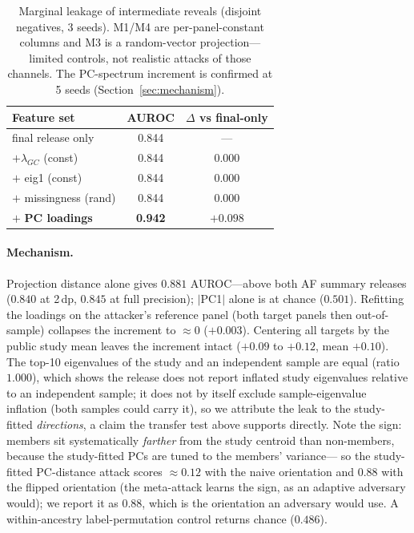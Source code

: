 \documentclass[11pt]{article}
\begin{document}
\begin{table}[t]
\centering
\caption{Marginal leakage of intermediate reveals (disjoint negatives, 3
seeds). M1/M4 are per-panel-constant columns and M3 is a random-vector
projection---limited controls, not realistic attacks of those channels. The
PC-spectrum increment is confirmed at 5 seeds (Section~\ref{sec:mechanism}).}
\label{tab:marginal}
\begin{tabular}{lcc}
\toprule
Feature set & AUROC & $\Delta$ vs final-only \\
\midrule
final release only & 0.844 & --- \\
$+\lambda_{GC}$ (const) & 0.844 & $0.000$ \\
$+$ eig1 (const) & 0.844 & $0.000$ \\
$+$ missingness (rand) & 0.844 & $0.000$ \\
$+$ \textbf{PC loadings} & \textbf{0.942} & $\mathbf{+0.098}$ \\
\bottomrule
\end{tabular}
\end{table}

\paragraph{Mechanism.} Projection distance alone gives $0.881$ AUROC---above
both AF summary releases ($0.840$ at 2\,dp, $0.845$ at full precision); $|$PC1$|$
alone is at chance ($0.501$). Refitting the loadings on the attacker's reference
panel (both target panels then out-of-sample) collapses the increment to
$\approx 0$ ($+0.003$). Centering all targets by the public study mean leaves
the increment intact ($+0.09$ to $+0.12$, mean $+0.10$). The top-10 eigenvalues
of the study and an independent sample are equal (ratio $1.000$), which shows the
release does not report inflated study eigenvalues relative to an independent
sample; it does not by itself exclude sample-eigenvalue inflation (both samples
could carry it), so we attribute the leak to the study-fitted \emph{directions},
a claim the transfer test above supports directly. Note the
sign: members sit systematically \emph{farther} from the study centroid than
non-members, because the study-fitted PCs are tuned to the members' variance---
so the study-fitted PC-distance attack scores $\approx 0.12$ with the naive
orientation and $0.88$ with the flipped orientation (the meta-attack learns the
sign, as an adaptive adversary would); we report it as $0.88$, which is the
orientation an adversary would use. A within-ancestry
label-permutation control returns chance ($0.486$).
\end{document}
